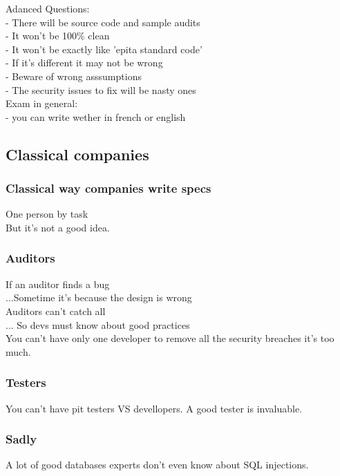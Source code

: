 \documentclass[a4paper,11pt]{article}
\begin{document}
Adanced Questions:\\
- There will be source code and sample audits\\
- It won't be 100\% clean\\
- It won't be exactly like 'epita standard code'\\
- If it's different it may not be wrong\\
- Beware of wrong asssumptions\\
- The security issues to fix will be nasty ones\\

Exam in general:\\
- you can write wether in french  or english\\

\subsection{Classical companies}
\subsubsection{Classical way companies write specs}
One person by task\\

But it's not a good idea.\\

\subsubsection{Auditors}

If an auditor finds a bug\\
...Sometime it's because the design is wrong\\
Auditors can't catch all\\
... So devs must know about good practices\\

You can't have only one developer to remove all the security breaches
it's too much.\\

\subsubsection{Testers}

You can't have pit testers VS devellopers.
A good tester is invaluable.


\subsubsection{Sadly}
A lot of good databases experts don't even know about SQL injections.
\end{document}
